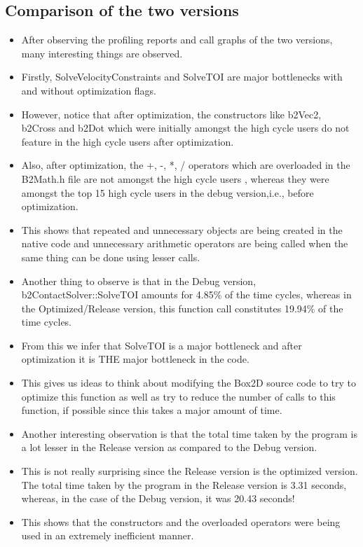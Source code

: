 \documentclass[11pt]{article}
\begin{document}
	\subsection{Comparison of the two versions}
		\begin{itemize}
		\item After observing the profiling reports and call graphs of the two versions, many interesting things are observed. 
		\item Firstly, SolveVelocityConstraints and SolveTOI are major bottlenecks with and without optimization flags. 		\item However, notice that after optimization, the constructors like b2Vec2, b2Cross and b2Dot which were initially amongst the high cycle users do not feature in the high cycle users after optimization. 
		\item Also, after optimization, the +, -, *, / operators which are overloaded in the B2Math.h file are not amongst the high cycle users , whereas they were amongst the top 15 high cycle users in the debug version,i.e., before optimization.
		\item This shows that repeated and unnecessary objects are being created in the native code and unnecessary arithmetic operators are being called when the same thing can be done using lesser calls.
		\item Another thing to observe is that in the Debug version, b2ContactSolver::SolveTOI amounts for 4.85\% of the time cycles, whereas in the Optimized/Release version, this function call constitutes 19.94\% of the time cycles. 
		\item From this we infer that SolveTOI is a major bottleneck and after optimization it is THE major bottleneck in the code. 
		\item This gives us ideas to think about modifying the Box2D source code to try to optimize this function as well as try to reduce the number of calls to this function, if possible since this takes a major amount of time.
		\item Another interesting observation is that the total time taken by the program is a lot lesser in the Release version as compared to the Debug version. 
		\item This is not really surprising since the Release version is the optimized version. The total time taken by the program in the Release version is 3.31 seconds, whereas, in the case of the Debug version, it was 20.43 seconds! 
		\item This shows that the constructors and the overloaded operators were being used in an extremely inefficient manner.
		\end{itemize}
\end{document}
